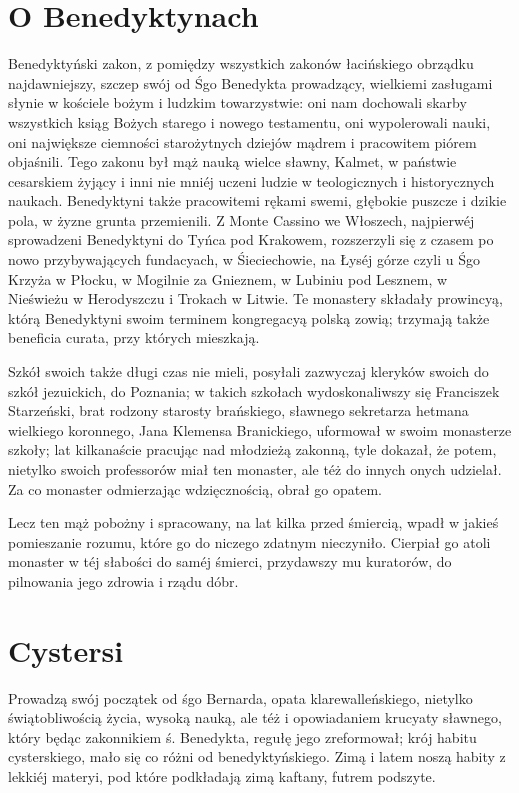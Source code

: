 \documentclass{book}
\begin{document}
\section{O Benedyktynach}

Benedyktyński zakon, z pomiędzy wszystkich zakonów łacińskiego obrządku najdawniejszy, szczep swój od Śgo Benedykta prowadzący, wielkiemi zasługami słynie w kościele bożym i ludzkim towarzystwie: oni nam dochowali skarby wszystkich ksiąg Bożych starego i nowego testamentu, oni wypolerowali nauki, oni największe ciemności starożytnych dziejów mądrem i pracowitem piórem objaśnili. Tego zakonu był mąż nauką wielce sławny, Kalmet, w państwie cesarskiem żyjący i inni nie mniéj uczeni ludzie w teologicznych i historycznych naukach. Benedyktyni także pracowitemi rękami swemi, głębokie puszcze i dzikie pola, w żyzne grunta przemienili. Z Monte Cassino we Włoszech, najpierwéj sprowadzeni Benedyktyni do Tyńca pod Krakowem, rozszerzyli się z czasem po nowo przybywających fundacyach, w Śieciechowie, na Łyséj górze czyli u Śgo Krzyża w Płocku, w Mogilnie za Gnieznem, w Lubiniu pod Lesznem, w Nieświeżu w Herodyszczu i Trokach w Litwie. Te monastery składały prowincyą, którą Benedyktyni swoim terminem kongregacyą polską zowią; trzymają także beneficia curata, przy których mieszkają.

Szkół swoich także długi czas nie mieli, posyłali zazwyczaj kleryków swoich do szkół jezuickich, do Poznania; w takich szkołach wydoskonaliwszy się Franciszek Starzeński, brat rodzony starosty brańskiego, sławnego sekretarza hetmana wielkiego koronnego, Jana Klemensa Branickiego, uformował w swoim monasterze szkoły; lat kilkanaście pracując nad młodzieżą zakonną, tyle dokazał, że potem, nietylko swoich professorów miał ten monaster, ale téż do innych onych udzielał. Za co monaster odmierzając wdzięcznością, obrał go opatem.

Lecz ten mąż pobożny i spracowany, na lat kilka przed śmiercią, wpadł w jakieś pomieszanie rozumu, które go do niczego zdatnym nieczyniło. Cierpiał go atoli monaster w téj słabości do saméj śmierci, przydawszy mu kuratorów, do pilnowania jego zdrowia i rządu dóbr.

\section{Cystersi}

Prowadzą swój początek od śgo Bernarda, opata klarewalleńskiego, nietylko świątobliwością życia, wysoką nauką, ale téż i opowiadaniem krucyaty sławnego, który będąc zakonnikiem ś. Benedykta, regułę jego zreformował; krój habitu cysterskiego, mało się co różni od benedyktyńskiego. Zimą i latem noszą habity z lekkiéj materyi, pod które podkładają zimą kaftany, futrem podszyte.
\end{document}
